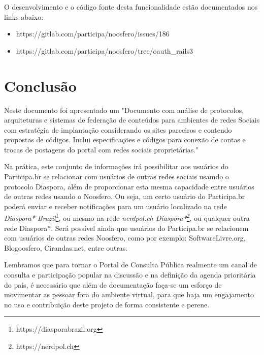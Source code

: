 \documentclass[12pt]{article}
\newcommand{\ProductDescription}{"Documento com análise de protocolos,
  arquiteturas e sistemas de federação de conteúdos para ambientes de redes
  Sociais com estratégia de implantação considerando os sites parceiros e
  contendo propostas de códigos. Inclui especificações e códigos para conexão
  de contas e trocas de postagens do portal com redes sociais proprietárias."
}
\begin{document}
O desenvolvimento e o código fonte desta funcionalidade estão documentados nos
links abaixo:

\begin{itemize}
  \item https://gitlab.com/participa/noosfero/issues/186
  \item https://gitlab.com/participa/noosfero/tree/oauth\_rails3
\end{itemize}


\section{Conclusão}

Neste documento foi apresentado um \ProductDescription

Na prática, este conjunto de informações irá possibilitar aos usuários do
Participa.br se relacionar com usuários de outras redes sociais usamdo o
protocolo Diaspora, além de proporcionar esta mesma capacidade entre usuários
de outras redes usando o Noosfero. Ou seja, um certo usuário do Participa.br
poderá enviar e receber notificações para um usuário localizado na rede {\it
Diaspora* Brazil}\footnote{https://diasporabrazil.org}, ou mesmo na rede {\it
nerdpol.ch Diaspora*}\footnote{https://nerdpol.ch}, ou qualquer outra rede
Diaspora*. Será possível ainda que usuários do Participa.br se relacionem com
usuários de outras redes Noosfero, como por exemplo: SoftwareLivre.org,
Blogoosfero, Cirandas.net, entre outras.

Lembramos que para tornar o Portal de Consulta Pública realmente um canal de
consulta e participação popular na discussão e na definição da agenda
prioritária do país, é necessário que além de documentação faça-se um esforço
de movimentar as pessoar fora do ambiente virtual, para que haja um
engajamento no uso e contribuição deste projeto de forma consistente e perene.

\newpage

\newpage
\listoffigures
\newpage
\printindex
\end{document}

